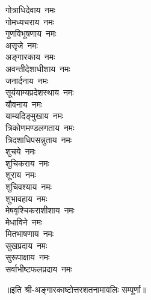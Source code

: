\begin{flushleft}
\begin{multicols}{2}
गोत्राधिदेवाय~नमः\\
गोमध्यचराय~नमः\\
गुणविभूषणाय~नमः\\
असृजे~नमः\\
अङ्गारकाय~नमः\hfill{}\\
अवन्तीदेशाधीशाय~नमः\\
जनार्दनाय~नमः\\
सूर्ययाम्यप्रदेशस्थाय~नमः\\
यौवनाय~नमः\\
याम्यदिङ्मुखाय~नमः\\
त्रिकोणमण्डलगताय~नमः\\
त्रिदशाधिपसन्नुताय~नमः\\
शुचये~नमः\\
शुचिकराय~नमः\\
शूराय~नमः\hfill{}\\
शुचिवश्याय~नमः\\
शुभावहाय~नमः\\
मेषवृश्चिकराशीशाय~नमः\\
मेधाविने~नमः\\
मितभाषणाय~नमः\\
सुखप्रदाय~नमः\\
सुरूपाक्षाय~नमः\\
सर्वाभीष्टफलप्रदाय~नमः\\
\end{multicols}
\end{flushleft}
॥इति श्री-अङ्गारकाष्टोत्तरशतनामावलिः सम्पूर्णा॥
